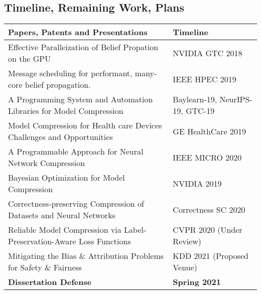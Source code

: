 \begin{refsection}
\section{Timeline, Remaining Work, Plans}
\label{sec:timeline}

\begin{table*}[h]
\centering
\begin{center}
\begin{sc}
\begin{tabular}{ll}
\toprule
\textbf{Papers, Patents and Presentations}                                                  & \textbf{Timeline}        \\ \midrule
Effective Paralleization of Belief Propation on the GPU                  & NVIDIA GTC 2018          \\ 
Message scheduling for performant, many-core belief propagation.         & IEEE HPEC 2019           \\ \midrule
A Programming System and Automation Libraries for Model Compression                           & Baylearn-19, NeurIPS-19, GTC-19 \\
Model Compression for Health care Devices Challenges and Opportunities    & GE HealthCare 2019       \\
A Programmable Approach for Neural Network  Compression                  & IEEE MICRO 2020          \\
Bayesian Optimization for Model Compression                              & NVIDIA 2019              \\ \midrule
Correctness-preserving Compression of Datasets and Neural Networks & Correctness SC 2020      \\
Reliable Model Compression via Label-Preservation-Aware Loss Functions   & CVPR 2020 (Under Review) \\
Mitigating the Bias \& Attribution Problems for Safety \& Fairness & KDD 2021 (Proposed Venue)                             \\ \midrule
\textbf{Dissertation Defense}                                            & \textbf{Spring 2021} \\   
\bottomrule
\end{tabular}
\label{tab:results}
  \end{sc}
\end{center}
\end{table*}

\end{refsection}